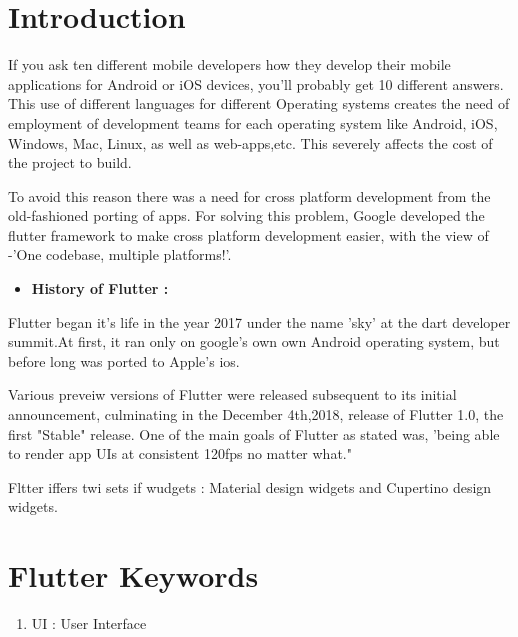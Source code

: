\documentclass[11pt,a4paper,oneside,openright]{report}
\begin{document}
{{\section{Introduction}
\hspace{0.2in} If you ask ten different mobile developers how they develop their mobile applications for Android or iOS devices, you'll probably get 10 different answers. This use of different languages for different Operating systems creates the need of employment of development teams for each operating system like Android, iOS, Windows, Mac, Linux, as well as web-apps,etc. This severely affects the cost of the project to build. 
				
\hspace{0.2in} To avoid this reason there was a need for cross platform development from the old-fashioned porting of apps. For solving this problem, Google developed the flutter framework to make cross platform development easier, with the view of -'One codebase, multiple platforms!'.
			

\begin{itemize}

\item {\bf History of Flutter : }
\end{itemize}
\hspace{0.2in} Flutter began it's life in the year 2017 under the name 'sky' at the dart developer summit.At first, it ran only on google's own own Android operating system, but before long was ported to Apple's ios. 

\hspace{0.2in} Various preveiw versions of Flutter were released subsequent to its initial announcement, culminating in the December  4th,2018, release of Flutter 1.0, the first "Stable" release. One of the main goals of Flutter as stated was, 'being able to render app UIs at consistent 120fps no matter what."

\hspace{0.2in} Fltter iffers twi sets if wudgets : Material design widgets and Cupertino design widgets.

\section{Flutter Keywords}
 \begin{enumerate}
 \item UI : User Interface
 \end{enumerate}


}}
\end{document}
